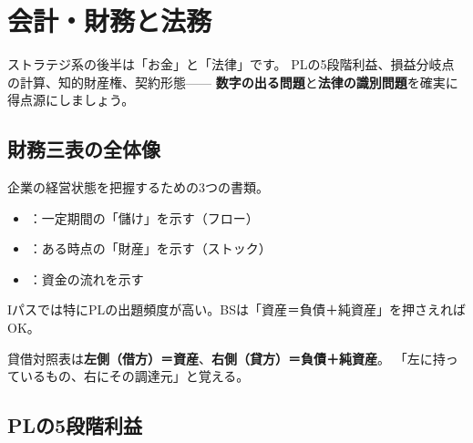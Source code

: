 \chapter{会計・財務と法務}


ストラテジ系の後半は「お金」と「法律」です。
PLの5段階利益、損益分岐点の計算、知的財産権、契約形態——
\textbf{数字の出る問題}と\textbf{法律の識別問題}を確実に得点源にしましょう。

\section{財務三表の全体像}

\begin{teigi}[財務三表とは]
企業の経営状態を把握するための3つの書類。
\begin{itemize}
  \item {}：一定期間の「儲け」を示す（フロー）
  \item {}：ある時点の「財産」を示す（ストック）
  \item {}：資金の流れを示す
\end{itemize}
Iパスでは特にPLの出題頻度が高い。BSは「資産＝負債＋純資産」を押さえればOK。
\end{teigi}

\begin{pitfall}[BSの左右を逆にしがち]
貸借対照表は\textbf{左側（借方）＝資産}、\textbf{右側（貸方）＝負債＋純資産}。
「左に持っているもの、右にその調達元」と覚える。
\end{pitfall}

\section{PLの5段階利益}

